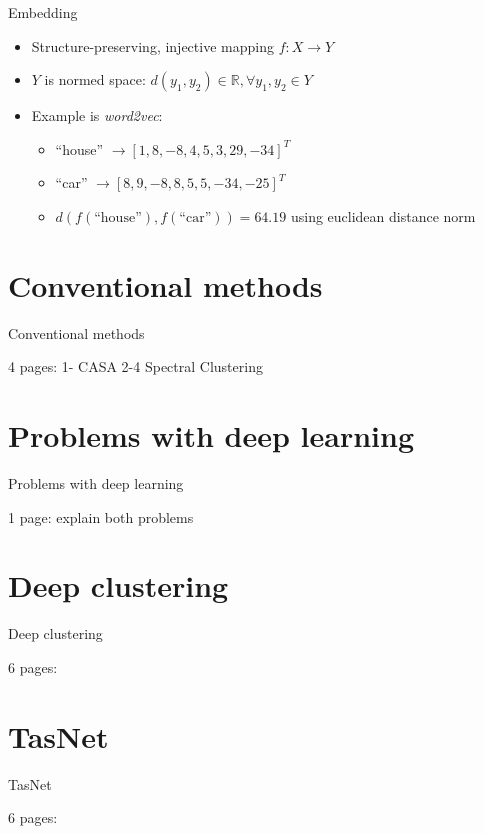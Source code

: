 \documentclass[xcolor=table,mathserif,9pt]{beamer}    %
\begin{document}
\begin{frame}{Embedding}

	\begin{itemize}
		\item Structure-preserving, injective mapping $f: X \to Y$
		\item $Y$ is normed space: $d(y_1,y_2) \in \mathbb{R}, \forall y_1,y_2 \in Y$
		\item Example is \emph{word2vec}: 
			\begin{itemize}
				\item ``house'' $\to \left[1, 8, -8, 4, 5, 3, 29, -34\right]^{T}$
				\item ``car'' $\to \left[8,9, -8, 8, 5, 5, -34, -25\right]^{T}$
				\item $d(f(\text{``house''}),f(\text{``car''})) = 64.19$ using euclidean distance norm
			\end{itemize}
	\end{itemize}



\end{frame}

\section{Conventional methods}%
\label{sec:conventional_methods}
\begin{frame}{Conventional methods}

4 pages:
	1- CASA
	2-4 Spectral Clustering
\end{frame}

\section{Problems with deep learning}%
\label{sec:problems_with_deep_learning}
\begin{frame}{Problems with deep learning}

1 page: explain both problems
\end{frame}

\section{Deep clustering}%
\label{sec:deep_clustering}
\begin{frame}{Deep clustering}

6 pages:
\end{frame}

\section{TasNet}%
\label{sec:tasnet}
\begin{frame}{TasNet}

6 pages:
\end{frame}
\end{document}
